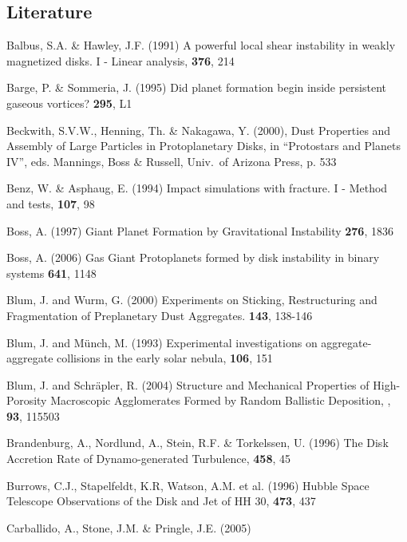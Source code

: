 \subsection{Literature}
%
%
%
\begin{literature}
\item Balbus, S.A. \& Hawley, J.F. (1991) 
  A powerful local shear instability in weakly magnetized disks. I - Linear
  analysis,
  \apj \textbf{376}, 214
\item Barge, P. \& Sommeria, J. (1995) 
  Did planet formation begin inside persistent gaseous vortices?
  \aap \textbf{295}, L1
\item Beckwith, S.V.W., Henning, Th. \& Nakagawa, Y. (2000), 
  Dust Properties and Assembly of Large Particles in Protoplanetary Disks,
  in ``Protostars
  and Planets IV'', eds. Mannings, Boss \& Russell, Univ.\ of Arizona Press,
  p. 533
\item Benz, W. \& Asphaug, E. (1994) 
  Impact simulations with fracture. I - Method and tests, 
  \ica \textbf{107}, 98
\item Boss, A. (1997) 
  Giant Planet Formation by Gravitational Instability
  \sci \textbf{276}, 1836
\item Boss, A. (2006)
  Gas Giant Protoplanets formed by disk instability in binary systems
  \apj \textbf{641}, 1148
\item Blum, J. and Wurm, G. (2000) 
  Experiments on Sticking, Restructuring and 
  Fragmentation of Preplanetary Dust Aggregates. 
  \ica \textbf{143}, 138-146
\item Blum, J. and M\"unch, M. (1993) 
  Experimental investigations on aggregate-aggregate collisions in the
  early solar nebula,
  \ica \textbf{106}, 151
\item Blum, J. and Schr\"apler, R. (2004) 
  Structure and Mechanical Properties of High-Porosity Macroscopic 
  Agglomerates Formed by Random Ballistic Deposition, 
  \prl, \textbf{93}, 115503
\item Brandenburg, A., Nordlund, A., Stein, R.F. \& Torkelssen, U. (1996)
  The Disk Accretion Rate of Dynamo-generated Turbulence,
  \apjl \textbf{458}, 45
\item Burrows, C.J., Stapelfeldt, K.R, Watson, A.M. et al. (1996)
  Hubble Space Telescope Observations of the Disk and Jet of HH 30,
  \apj \textbf{473}, 437
\item Carballido, A., Stone, J.M. \& Pringle, J.E. (2005) 

\end{literature}
